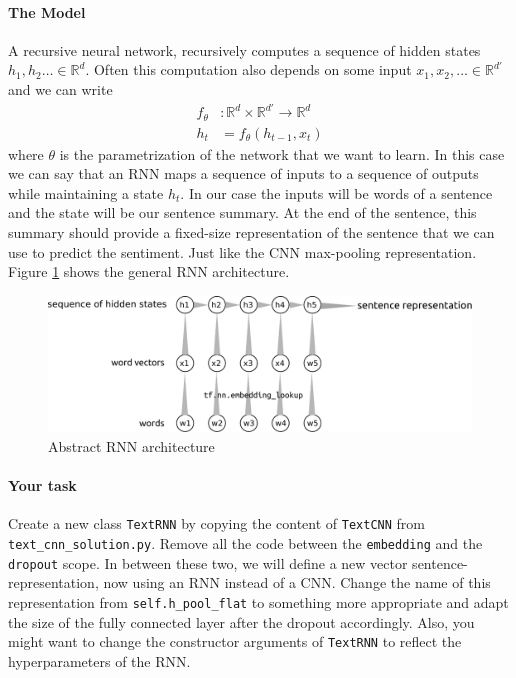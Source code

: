 \documentclass{article}
\begin{document}
\paragraph{The Model}
A recursive neural network, recursively computes a sequence of hidden states $h_1,h_2\dots\in\mathbb R^d$. Often this computation also depends on some input $x_1,x_2,\dots\in\mathbb R^{d'}$ and we can write
\begin{align*}
	f_\theta&: \mathbb R^d \times \mathbb R^{d'} \rightarrow \mathbb R^d\\
	h_t&=f_\theta(h_{t-1},x_t)
\end{align*}
where $\theta$ is the parametrization of the network that we want to learn. In this case we can say that an RNN maps a sequence of inputs to a sequence of outputs while maintaining a state $h_t$. In our case the inputs will be words of a sentence and the state will be our sentence summary. At the end of the sentence, this summary should provide a fixed-size representation of the sentence that we can use to predict the sentiment. Just like the CNN max-pooling representation. Figure \ref{fig:rnnArchitecture} shows the general RNN architecture. 
\begin{figure}[ht]
	\includegraphics[scale=0.6]{images/rnn.pdf}
	\caption{Abstract RNN architecture}
	\label{fig:rnnArchitecture}
\end{figure}


\paragraph{Your task}
Create a new class \texttt{TextRNN} by copying the content of \texttt{TextCNN} from \texttt{text\_cnn\_solution.py}. Remove all the code between the \texttt{embedding} and the \texttt{dropout} scope. In between these two, we will define a new vector sentence-representation, now using an RNN instead of a CNN. Change the name of this representation from \texttt{self.h\_pool\_flat} to something more appropriate and adapt the size of the fully connected layer after the dropout accordingly. Also, you might want to change the constructor arguments of \texttt{TextRNN} to reflect the hyperparameters of the RNN.
\end{document}
